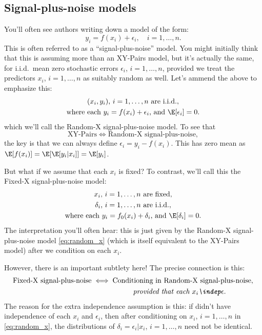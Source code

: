 \documentclass{article}
\begin{document}
\subsection{Signal-plus-noise models}

You'll often see authors writing down a model of the form:   
\[
y_i = f(x_i) + \epsilon_i, \quad i=1,\dots,n.
\]
This is often referred to as a ``signal-plus-noise'' model. You might initially
think that this is assuming more than an XY-Pairs model, but it's actually the
same, for i.i.d.\ mean zero stochastic errors $\epsilon_i$, $i=1,\dots,n$,
provided we treat the predictors $x_i$, $i=1,\dots,n$ as suitably random as 
well. Let's ammend the above to emphasize this:   
\begin{equation}
\begin{gathered}
\label{eq:random_x}
\text{$(x_i, y_i)$, $i=1,\dots,n$ are i.i.d.}, \\
\text{where each $y_i = f(x_i) + \epsilon_i$, and $\E[\epsilon_i] = 0$}. 
\end{gathered}
\end{equation}
which we'll call the Random-X signal-plus-noise model. To see that
\[
\text{XY-Pairs} \iff \text{Random-X signal-plus-noise},
\]
the key is that we can always define $\epsilon_i = y_i - f(x_i)$. This has zero
mean as $\E[f(x_i)] = \E[\E[y_i|x_i]] = \E[y_i]$.   

But what if we assume that each $x_i$ is fixed? To contrast, we'll call this the
Fixed-X signal-plus-noise model: 
\begin{equation}
\begin{gathered}
\label{eq:fixed_x}
\text{$x_i$, $i=1,\dots,n$ are fixed}, \\
\text{$\delta_i$, $i=1,\dots,n$ are i.i.d.}, \\
\text{where each $y_i = f_0(x_i) + \delta_i$, and $\E[\delta_i] = 0$}. 
\end{gathered}
\end{equation}
The interpretation you'll often hear: this is just given by the Random-X 
signal-plus-noise model \eqref{eq:random_x} (which is itself equivalent to the
XY-Pairs model) after we condition on each $x_i$.          

However, there is an important subtlety here! The precise connection is this: 
\begin{gather*}
\text{Fixed-X signal-plus-noise} \iff \text{Conditioning in Random-X
  signal-plus-noise}, \\  
\hspace{130pt} \text{\emph{provided that each $x_i \indep \epsilon$}}.  
\end{gather*}
The reason for the extra independence assumption is this: if didn't have
independence of each $x_i$ and $\epsilon_i$, then after conditioning on $x_i$,
$i=1,\dots,n$ in \eqref{eq:random_x}, the distributions of $\delta_i =
\epsilon_i | x_i$, $i=1,\dots,n$ need not be identical.  
\end{document}
